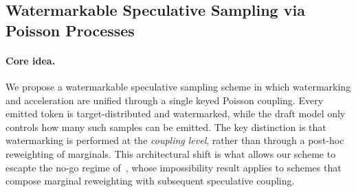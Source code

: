 \documentclass{article}
\theoremstyle{plain}
\theoremstyle{definition}
\begin{document}
\subsection{Watermarkable Speculative Sampling via Poisson Processes}
\vspace{-5pt}

{\color{teal}

\paragraph{Core idea.} 
We propose a watermarkable speculative sampling scheme in which watermarking and acceleration are unified through a single keyed Poisson coupling. 
Every emitted token is target-distributed and watermarked, while the draft model only controls how many such samples can be emitted. 
The key distinction is that watermarking is performed at the \emph{coupling level}, rather than through a post-hoc reweighting of marginals. This architectural shift is what allows our scheme to escapte the no-go regime of~\citep{hu2024inevitable}, whose impossibility result applies to schemes that compose marginal reweighting with subsequent speculative coupling. 
}

\end{document}
